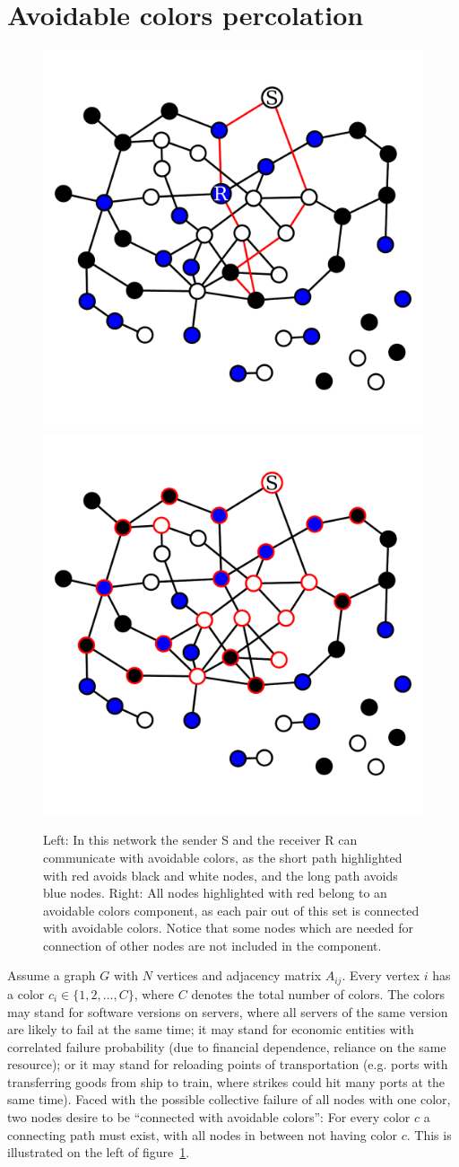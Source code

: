 \documentclass[aps, pre, twocolumn, a4paper, floatfix]{revtex4}
\begin{document}
\section{Avoidable colors percolation}

\begin{figure}[htb]
\begin{center}
    \includegraphics[width=0.49\columnwidth]{graph_sr.pdf}
    \includegraphics[width=0.49\columnwidth]{graph_Gcolor.pdf}
    \caption{Left: In this network the sender S and the receiver R can communicate 
    with avoidable colors, as the short path highlighted with red avoids black and 
    white nodes, and the long path avoids blue nodes. Right: All nodes highlighted 
    with red belong to an avoidable colors component, as each pair out of this set 
    is connected with avoidable colors. Notice that some nodes which are needed 
    for connection of other nodes are not included in the component.}
    \label{fig:avoidable_colors}
\end{center}
\end{figure}
%
Assume a graph $G$ with $N$ vertices and adjacency matrix $A_{ij}$. Every vertex 
$i$ has a color $c_i\in\{1,2,\dots,C\}$, where $C$ denotes the total number of colors. 
The colors may stand for software versions on servers, where all servers of the 
same version are likely to fail at the same time; it may stand for economic entities 
with correlated failure probability (due to financial dependence, reliance on the same resource); 
or it may stand for reloading points of transportation (e.g. ports with transferring goods from 
ship to train, where strikes could hit many ports at the same time). Faced with the possible 
collective failure of all nodes with one color, two nodes desire to be ``connected with 
avoidable colors'': For every color $c$ a connecting path must exist, with all nodes 
in between not having color $c$. This is illustrated on the left of 
figure~\ref{fig:avoidable_colors}. 
\end{document}
